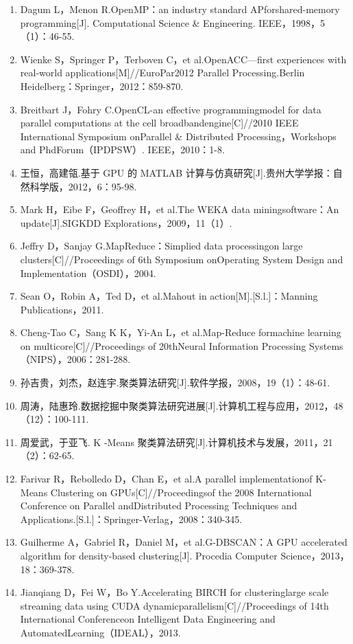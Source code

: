 \documentclass{article}
\begin{document}
\begin{enumerate}[labelsep = 0em, leftmargin = 10pt, itemindent = 0em]
        \item  Dagum L，Menon R.OpenMP：an industry standard APforshared-memory programming[J]. Computational Science \& Engineering. IEEE，1998，5（1）：46-55.
        \item  Wienke S，Springer P，Terboven C，et al.OpenACC—first experiences with real-world applications[M]//EuroPar2012 Parallel Processing.Berlin Heidelberg：Springer，2012：859-870.
        \item  Breitbart J，Fohry C.OpenCL-an effective programmingmodel for data parallel computations at the cell broadbandengine[C]//2010 IEEE International Symposium onParallel \& Distributed Processing，Workshops and PhdForum（IPDPSW）. IEEE，2010：1-8.
        \item  王恒，高建瓴.基于 GPU 的 MATLAB 计算与仿真研究[J].贵州大学学报：自然科学版，2012，6：95-98.
        \item  Mark H，Eibe F，Geoffrey H，et al.The WEKA data miningsoftware：An update[J].SIGKDD Explorations，2009，11（1）.
        \item  Jeffry D，Sanjay G.MapReduce：Simplied data processingon large clusters[C]//Proceedings of 6th Symposium onOperating System Design and Implementation（OSDI），2004.
        \item  Sean O，Robin A，Ted D，et al.Mahout in action[M].[S.l.]：Manning Publications，2011.
        \item  Cheng-Tao C，Sang K K，Yi-An L，et al.Map-Reduce formachine learning on multicore[C]//Proceedings of 20thNeural Information Processing Systems（NIPS），2006：281-288.
        \item  孙吉贵，刘杰，赵连宇.聚类算法研究[J].软件学报，2008，19（1）：48-61.
        \item  周涛，陆惠玲.数据挖掘中聚类算法研究进展[J].计算机工程与应用，2012，48（12）：100-111.
        \item  周爱武，于亚飞. K -Means 聚类算法研究[J].计算机技术与发展，2011，21（2）：62-65.
        \item  Farivar R，Rebolledo D，Chan E，et al.A parallel implementationof K-Means Clustering on GPUs[C]//Proceedingsof the 2008 International Conference on Parallel andDistributed Processing Techniques and Applications.[S.l.]：Springer-Verlag，2008：340-345.
        \item  Guilherme A，Gabriel R，Daniel M，et al.G-DBSCAN：A GPU accelerated algorithm for density-based clustering[J]. Procedia Computer Science，2013，18：369-378.
        \item  Jianqiang D，Fei W，Bo Y.Accelerating BIRCH for clusteringlarge scale streaming data using CUDA dynamicparallelism[C]//Proceedings of 14th International Conferenceon Intelligent Data Engineering and AutomatedLearning（IDEAL），2013.

\end{enumerate}
\end{document}
